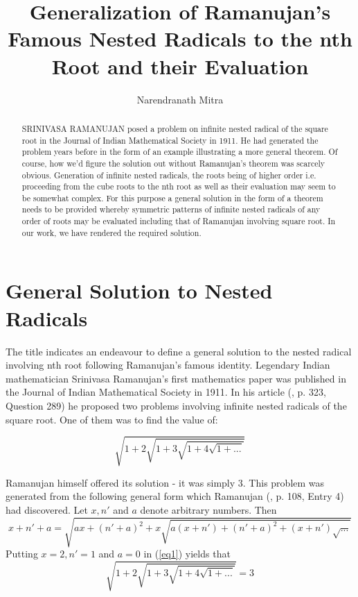 \documentclass[runningheads]{llncs}
\begin{document}
%
\title{Generalization of Ramanujan's Famous Nested Radicals to the nth Root and their Evaluation}
%
\author{Narendranath Mitra}
%
%
\maketitle              %
%
\begin{abstract}
\fontsize{9}{12}\selectfont \sloppy SRINIVASA RAMANUJAN posed a problem on infinite nested radical of the square root in the Journal of Indian Mathematical Society in 1911. He had generated the problem years before in the form of an example illustrating a more general theorem. Of course, how we'd figure the solution out without Ramanujan's theorem was scarcely obvious. Generation of infinite nested radicals, the roots being of higher order i.e. proceeding from the cube roots to the nth root as well as their evaluation may seem to be somewhat complex. For this purpose a general solution in the form of a theorem needs to be provided whereby symmetric patterns of infinite nested radicals of any order of roots may be evaluated including that of Ramanujan involving square root. In our work, we have rendered the required solution. 

\end{abstract}
%
%
%
\section{General Solution to Nested Radicals}
The title indicates an endeavour to define a general solution to the nested radical involving nth root following Ramanujan's famous identity. Legendary Indian mathematician Srinivasa Ramanujan's first mathematics paper was published in the Journal of Indian Mathematical Society in 1911. In his article (\cite{Ramanujan}, p. 323, Question 289) he proposed two problems involving infinite nested radicals of the square root. One of them was to find the value of:

\[ \sqrt{1+2\sqrt{1+3\sqrt{1+4\sqrt{1+...}}}} \]

Ramanujan himself offered its solution - it was simply 3. This problem was generated from the following general form which Ramanujan (\cite{Berndt}, p. 108, Entry 4) had discovered.
Let $x, n'$ and $a$ denote arbitrary numbers. Then
\begin{equation} \label{eq1}
x+n'+a = \sqrt{ax + (n'+a)^2 + x\sqrt{a(x+n') + (n'+a)^2 + (x+n')\sqrt{...}}} 
\end{equation}
Putting $ x=2, n'=1 $ and $a=0$ in (\ref{eq1}) yields that
\begin{equation} \label{eq2}
\sqrt{1+2\sqrt{1+3\sqrt{1+4\sqrt{1+...}}}} = 3
\end{equation}
\end{document}
